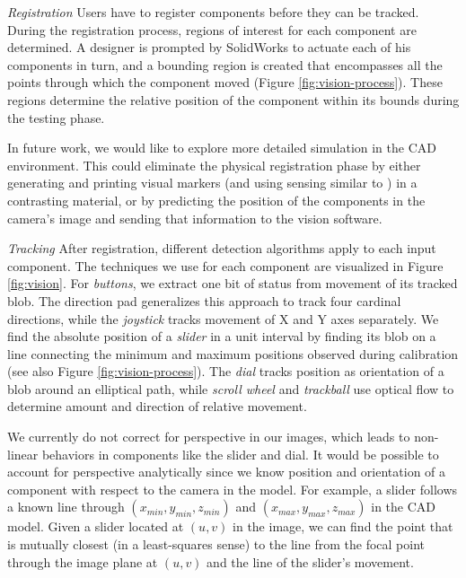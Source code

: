 \emph{Registration}
Users have to register components before they can be tracked. During the registration process, regions of interest for each component are determined.  A designer is prompted by SolidWorks to actuate each of his components in turn, and a bounding region is created that encompasses all the points through which the component moved (Figure \ref{fig:vision-process}).  These regions determine the relative position of the component within its bounds during the testing phase.

In future work, we would like to explore more detailed simulation in the CAD environment.  This could eliminate the physical registration phase by either generating and printing visual markers (and using sensing similar to \cite{doering-wip}) in a contrasting material, or by predicting the position of the components in the camera's image and sending that information to the vision software.

\emph{Tracking}
After registration, different detection algorithms apply to each input component.  The techniques we use for each component are visualized in Figure \ref{fig:vision}. For {\em buttons}, we extract one bit of status from movement of its tracked blob. The direction pad generalizes this approach to track four cardinal directions, while the {\em joystick} tracks movement of X and Y axes separately. We find the absolute position of a {\em slider} in a unit interval by finding its blob on a line connecting the minimum and maximum positions observed during calibration (see also Figure \ref{fig:vision-process}). The {\em dial} tracks position as orientation of a blob around an elliptical path, while {\em scroll wheel} and {\em trackball} use optical flow to determine amount and direction of relative movement.

We currently do not correct for perspective in our images, which leads to non-linear behaviors in components like the slider and dial.  It would be possible to account for perspective analytically since we know position and orientation of a component with respect to the camera in the model. For example, a slider follows a known line through $(x_{min}, y_{min},z_{min})$ and $(x_{max},y_{max},z_{max})$   in the CAD model.
Given a slider located at $(u,v)$ in the image, we can find the point that is mutually closest (in a least-squares sense) to the line from the focal point through the image plane at $(u,v)$ and the line of the slider's movement.

